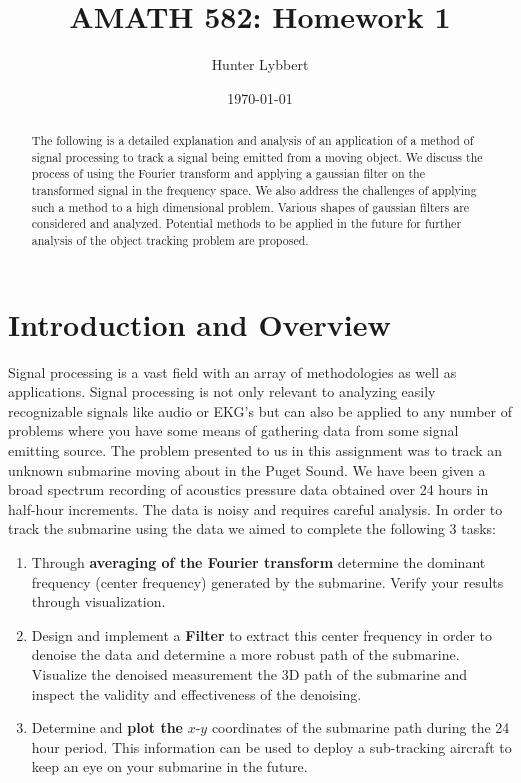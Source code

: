 \documentclass[11pt]{amsart}
\title{AMATH 582: Homework 1}
\author{Hunter Lybbert} %
\date{\today} %
\begin{document}
\maketitle

\begin{abstract}
    The following is a detailed explanation and analysis of an application of a method of signal processing to track a signal being emitted from a moving object. We discuss the process of using the Fourier transform and applying a gaussian filter on the transformed signal in the frequency space. We also address the challenges of applying such a method to a high dimensional problem. Various shapes of gaussian filters are considered and analyzed. Potential methods to be applied in the future for further analysis of the object tracking problem are proposed. 
\end{abstract}

\section{Introduction and Overview}\label{sec:Introduction}
Signal processing is a vast field with an array of methodologies as well as applications.
Signal processing is not only relevant to analyzing easily recognizable signals like audio or EKG's but can also be applied to any number of problems where you have some means of gathering data from some signal emitting source.
The problem presented to us in this assignment was to track an unknown submarine moving about in the Puget Sound.
We have been given a broad spectrum recording of acoustics pressure data obtained over 24 hours in half-hour increments.
The data is noisy and requires careful analysis.
In order to track the submarine using the data we aimed to complete the following 3 tasks: \\
\begin{enumerate}
\item Through \textbf{averaging of the Fourier transform} determine the dominant frequency (center frequency)
generated by the submarine. Verify your results through visualization. \\

\item Design and implement a \textbf{Filter} to extract this center frequency in order to denoise the data and
determine a more robust path of the submarine. Visualize the denoised measurement the 3D path of
the submarine and inspect the validity and effectiveness of the denoising. \\

\item Determine and \textbf{plot the} $x$-$y$ coordinates of the submarine path during the 24 hour period. This
information can be used to deploy a sub-tracking aircraft to keep an eye on your submarine in the future.

\end{enumerate}
\end{document}
